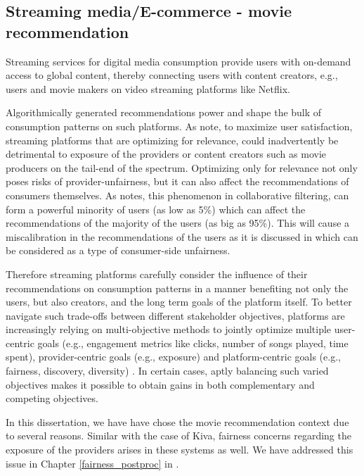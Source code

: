     \subsection{Streaming media/E-commerce - movie recommendation}

    Streaming services for digital media consumption provide users with on-demand access to global content, thereby connecting users with content creators, e.g., users and movie makers on video streaming platforms like Netflix.
    
    Algorithmically generated recommendations power and shape the bulk of consumption patterns on such platforms. As \cite{mehrotra2018towards} note, to maximize user satisfaction, streaming platforms that are optimizing for relevance, could inadvertently be detrimental to exposure of the providers or content creators such as movie producers on the tail-end of the spectrum. Optimizing only for relevance not only poses risks of provider-unfairness, but it can also affect the recommendations of consumers themselves. As \cite{eskandanian2019power} notes, this phenomenon in collaborative filtering, can form a powerful minority of users (as low as 5\%) which can affect the recommendations of the majority of the users (as big as 95\%). This will cause a miscalibration in the recommendations of the users as it is discussed in \cite{steck2018calibrated} which can be considered as a type of consumer-side unfairness. 
    
    Therefore streaming platforms carefully consider the influence of their recommendations on consumption patterns in a manner benefiting not only the users, but also creators, and the long term goals of the platform itself. To better navigate such trade-offs between different stakeholder objectives, platforms are increasingly relying on multi-objective methods to jointly optimize multiple user-centric goals (e.g., engagement metrics like clicks, number of songs played, time spent), provider-centric goals (e.g., exposure) and platform-centric goals (e.g., fairness, discovery, diversity) \cite{mehrotra2020bandit}. In certain cases, aptly balancing such varied objectives makes it possible to obtain gains in both complementary and competing objectives.
    
    In this dissertation, we have have chose the movie recommendation context due to several reasons. Similar with the case of Kiva, fairness concerns regarding the exposure of the providers arises in these systems as well. We have addressed this issue in Chapter \ref{fairness_postproc} in \cite{sonboli2020opportunistic,liu2019farpfar} .
    
